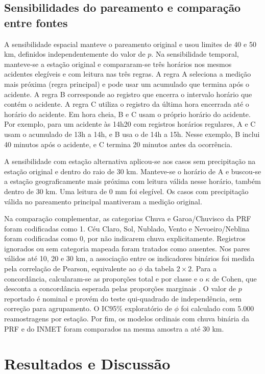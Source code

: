 \documentclass[12pt]{article}
\begin{document}
\subsection{Sensibilidades do pareamento e comparação entre fontes}

A sensibilidade espacial manteve o pareamento original e usou limites
de 40 e 50 km, definidos independentemente do valor de $p$. Na sensibilidade
temporal, manteve-se a estação original e compararam-se três horários
nos mesmos acidentes elegíveis e com leitura nas três regras. A regra A
seleciona a medição mais próxima (regra principal) e pode usar um acumulado
que termina após o acidente. A regra B corresponde ao registro que encerra
o intervalo horário que contém o acidente. A regra C utiliza o registro da
última hora encerrada até o horário do acidente. Em hora cheia, B e C usam
o próprio horário do acidente. Por exemplo, para um acidente às 14h20 com
registros horários regulares, A e C usam o acumulado de 13h a 14h, e B usa
o de 14h a 15h. Nesse exemplo, B inclui 40 minutos após o acidente, e C
termina 20 minutos antes da ocorrência.

A sensibilidade com estação alternativa aplicou-se aos casos sem
precipitação na estação original e dentro do raio de 30 km. Manteve-se
o horário de A e buscou-se a estação geograficamente mais próxima com
leitura válida nesse horário, também dentro de 30 km. Uma leitura de 0 mm
foi elegível. Os casos com precipitação válida no pareamento principal
mantiveram a medição original.

Na comparação complementar, as categorias Chuva e Garoa/Chuvisco da PRF
foram codificadas como 1. Céu Claro, Sol, Nublado, Vento e Nevoeiro/Neblina
foram codificadas como 0, por não indicarem chuva explicitamente. Registros
ignorados ou sem categoria mapeada foram tratados como ausentes.
Nos pares válidos até 10, 20 e 30 km, a associação entre os indicadores
binários foi medida pela correlação de Pearson, equivalente ao $\phi$ da
tabela $2\times 2$. Para a concordância, calcularam-se as proporções total
e por classe e o $\kappa$ de Cohen, que desconta a concordância esperada
pelas proporções marginais \cite{cohen1960}. O valor de $p$ reportado é
nominal e provém do teste qui-quadrado de independência, sem correção
para agrupamento. O IC95\% exploratório de $\phi$ foi calculado com
5.000 reamostragens por estação. Por fim, os modelos ordinais com chuva
binária da PRF e do INMET foram comparados na mesma amostra a até 30 km.

\section{Resultados e Discussão}
\end{document}
